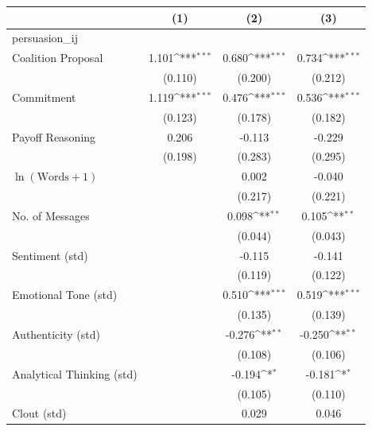 \renewcommand{\arraystretch}{0.85}
\def\sym#1{\ifmmode^{#1}\else\(^{#1}\)\fi}
\begin{tabular}{lccc}
\toprule
                &\multicolumn{1}{c}{(1)}         &\multicolumn{1}{c}{(2)}         &\multicolumn{1}{c}{(3)}         \\
\midrule
persuasion\_ij   &                  &                  &                  \\
Coalition Proposal&    1.101\sym{***}&    0.680\sym{***}&    0.734\sym{***}\\
                &  (0.110)         &  (0.200)         &  (0.212)         \\
Commitment      &    1.119\sym{***}&    0.476\sym{***}&    0.536\sym{***}\\
                &  (0.123)         &  (0.178)         &  (0.182)         \\
Payoff Reasoning&    0.206         &   -0.113         &   -0.229         \\
                &  (0.198)         &  (0.283)         &  (0.295)         \\
$\ln(\text{Words} + 1)$&                  &    0.002         &   -0.040         \\
                &                  &  (0.217)         &  (0.221)         \\
No. of Messages &                  &    0.098\sym{**} &    0.105\sym{**} \\
                &                  &  (0.044)         &  (0.043)         \\
Sentiment (std) &                  &   -0.115         &   -0.141         \\
                &                  &  (0.119)         &  (0.122)         \\
Emotional Tone (std)&                  &    0.510\sym{***}&    0.519\sym{***}\\
                &                  &  (0.135)         &  (0.139)         \\
Authenticity (std)&                  &   -0.276\sym{**} &   -0.250\sym{**} \\
                &                  &  (0.108)         &  (0.106)         \\
Analytical Thinking (std)&                  &   -0.194\sym{*}  &   -0.181\sym{*}  \\
                &                  &  (0.105)         &  (0.110)         \\
Clout (std)     &                  &    0.029         &    0.046         \\

\end{tabular}
